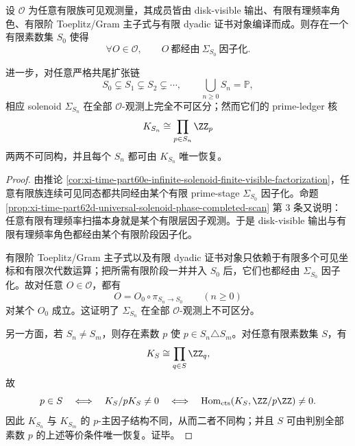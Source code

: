 \begin{theorem}\label{thm:xi-time-part60eb-cofinal-prime-ledger-finite-horizon-nonreconstruction}
设 \(\mathcal O\) 为任意有限族可见观测量，其成员皆由 disk-visible 输出、有限有理频率角色、有限阶 Toeplitz/Gram 主子式与有限 dyadic 证书对象编译而成。则存在一个有限素数集 \(S_0\) 使得
\[
\forall O\in\mathcal O,\qquad
O\ \text{都经由}\ \Sigma_{S_0}\ \text{因子化}.
\]

进一步，对任意严格共尾扩张链
\[
S_0\subsetneq S_1\subsetneq S_2\subsetneq \cdots,
\qquad
\bigcup_{n\ge 0}S_n=\mathbb P,
\]
相应 solenoid \(\Sigma_{S_n}\) 在全部 \(\mathcal O\)-观测上完全不可区分；然而它们的 prime-ledger 核
\[
K_{S_n}\cong \prod_{p\in S_n}\ZZ_p
\]
两两不可同构，并且每个 \(S_n\) 都可由 \(K_{S_n}\) 唯一恢复。
\end{theorem}
\begin{proof}
由推论 \ref{cor:xi-time-part60e-infinite-solenoid-finite-visible-factorization}，任意有限族连续可见同态都共同经由某个有限 prime-stage \(\Sigma_{S_0}\) 因子化。命题 \ref{prop:xi-time-part62d-universal-solenoid-phase-completed-scan} 第 \(3\) 条又说明：任意有限有理频率扫描本身就是某个有限层因子观测。于是 disk-visible 输出与有限有理频率角色都经由某个有限阶段因子化。

有限阶 Toeplitz/Gram 主子式以及有限 dyadic 证书对象只依赖于有限多个可见坐标和有限次代数运算；把所需有限阶段一并并入 \(S_0\) 后，它们也都经由 \(\Sigma_{S_0}\) 因子化。故对任意 \(O\in\mathcal O\)，都有
\[
O=O_0\circ \pi_{S_n\to S_0}
\qquad(n\ge 0)
\]
对某个 \(O_0\) 成立。这证明了 \(\Sigma_{S_n}\) 在全部 \(\mathcal O\)-观测上不可区分。

另一方面，若 \(S_n\neq S_m\)，则存在素数 \(p\) 使 \(p\in S_n\triangle S_m\)。对任意有限素数集 \(S\)，有
\[
K_S\cong \prod_{q\in S}\ZZ_q,
\]
故
\[
p\in S
\quad\Longleftrightarrow\quad
K_S/pK_S\neq 0
\quad\Longleftrightarrow\quad
\operatorname{Hom}_{\mathrm{cts}}(K_S,\ZZ/p\ZZ)\neq 0.
\]
因此 \(K_{S_n}\) 与 \(K_{S_m}\) 的 \(p\)-主因子结构不同，从而二者不同构；并且 \(S\) 可由判别全部素数 \(p\) 的上述等价条件唯一恢复。证毕。
\end{proof}

